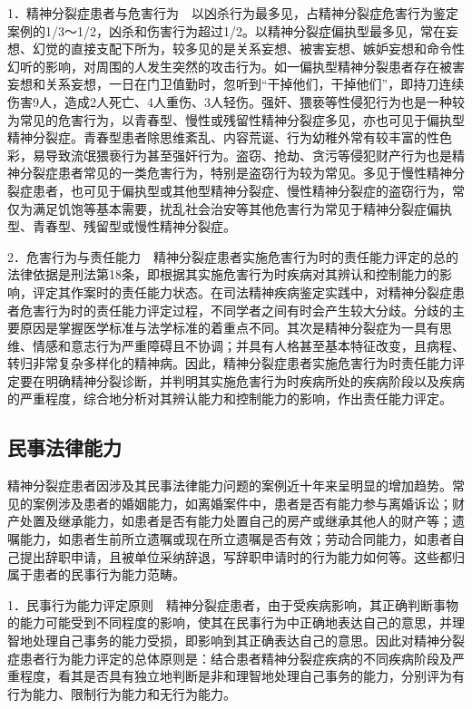 1．精神分裂症患者与危害行为　以凶杀行为最多见，占精神分裂症危害行为鉴定案例的1/3～1/2，凶杀和伤害行为超过1/2。以精神分裂症偏执型最多见，常在妄想、幻觉的直接支配下所为，较多见的是关系妄想、被害妄想、嫉妒妄想和命令性幻听的影响，对周围的人发生突然的攻击行为。如一偏执型精神分裂患者存在被害妄想和关系妄想，一日在门卫值勤时，忽听到“干掉他们，干掉他们”，即持刀连续伤害9人，造成2人死亡、4人重伤、3人轻伤。强奸、猥亵等性侵犯行为也是一种较为常见的危害行为，以青春型、慢性或残留性精神分裂症多见，亦也可见于偏执型精神分裂症。青春型患者除思维紊乱、内容荒诞、行为幼稚外常有较丰富的性色彩，易导致流氓猥亵行为甚至强奸行为。盗窃、抢劫、贪污等侵犯财产行为也是精神分裂症患者常见的一类危害行为，特别是盗窃行为较为常见。多见于慢性精神分裂症患者，也可见于偏执型或其他型精神分裂症、慢性精神分裂症的盗窃行为，常仅为满足饥饱等基本需要，扰乱社会治安等其他危害行为常见于精神分裂症偏执型、青春型、残留型或慢性精神分裂症。

2．危害行为与责任能力　精神分裂症患者实施危害行为时的责任能力评定的总的法律依据是刑法第18条，即根据其实施危害行为时疾病对其辨认和控制能力的影响，评定其作案时的责任能力状态。在司法精神疾病鉴定实践中，对精神分裂症患者危害行为时的责任能力评定过程，不同学者之间有时会产生较大分歧。分歧的主要原因是掌握医学标准与法学标准的着重点不同。其次是精神分裂症为一具有思维、情感和意志行为严重障碍且不协调；并具有人格甚至基本特征改变，且病程、转归非常复杂多样化的精神病。因此，精神分裂症患者实施危害行为时责任能力评定要在明确精神分裂诊断，并判明其实施危害行为时疾病所处的疾病阶段以及疾病的严重程度，综合地分析对其辨认能力和控制能力的影响，作出责任能力评定。

\subsection{民事法律能力}

精神分裂症患者因涉及其民事法律能力问题的案例近十年来呈明显的增加趋势。常见的案例涉及患者的婚姻能力，如离婚案件中，患者是否有能力参与离婚诉讼；财产处置及继承能力，如患者是否有能力处置自己的房产或继承其他人的财产等；遗嘱能力，如患者生前所立遗嘱或现在所立遗嘱是否有效；劳动合同能力，如患者自己提出辞职申请，且被单位采纳辞退，写辞职申请时的行为能力如何等。这些都归属于患者的民事行为能力范畴。

1．民事行为能力评定原则　精神分裂症患者，由于受疾病影响，其正确判断事物的能力可能受到不同程度的影响，使其在民事行为中正确地表达自己的意思，并理智地处理自己事务的能力受损，即影响到其正确表达自己的意思。因此对精神分裂症患者行为能力评定的总体原则是：结合患者精神分裂症疾病的不同疾病阶段及严重程度，看其是否具有独立地判断是非和理智地处理自己事务的能力，分别评为有行为能力、限制行为能力和无行为能力。

